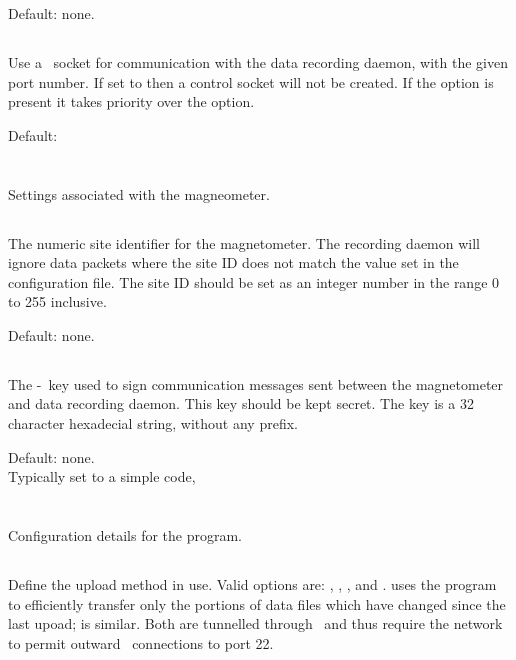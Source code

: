 Default: none.

\subsection{}
Use a \udp\ socket for communication with the data recording
daemon, with the given port number. If set to  then a
control socket will not be created. If the  option is
present it takes priority over the  option.

Default: 


\section{\code{[magnetometer]}}

Settings associated with the magneometer.

\subsection{}

The numeric site identifier for the magnetometer. The recording daemon
will ignore data packets where the site ID does not match the value
set in the configuration file. The site ID should be set as an integer
number in the range 0 to 255 inclusive.

Default: none.

\subsection{}
The \hmac-\mdfive\ key used to sign communication messages sent between
the magnetometer and data recording daemon. This key should be kept
secret. The key is a 32 character hexadecial string, without any
 prefix.

Default: none.\\
Typically set to a simple code, 


\section{\code{[upload]}}
Configuration details for the  program.

\subsection{}
Define the upload method in use. Valid options are: ,
, , and .  uses the
 program to efficiently transfer only the portions of
data files which have changed since the last upoad;  is
similar. Both are tunnelled through \ssh\ and thus require the network
to permit outward \tcp\ connections to port 22.

